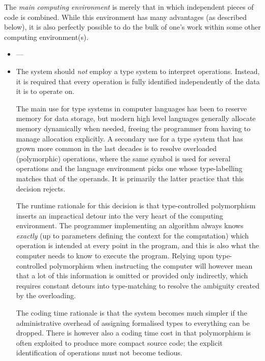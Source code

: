 \documentclass{mtmtcl}
\theoremstyle{plain}
\theoremstyle{remark}
\begin{document}
The \emph{main computing environment} is merely that in which 
independent pieces of code is combined. While this environment has 
many advantages (as described below), it is also perfectly possible 
to do the bulk of one's work within some other computing 
environment(s).


    
\begin{itemize}
    
  \item
    
    
    
    
    ---
    
    
    
  \item
    The system should \emph{not} employ a type system to interpret 
    operations. Instead, it is required that every operation is fully 
    identified independently of the data it is to operate on.
    
    The main use for type systems in computer languages has been to 
    reserve memory for data storage, but modern high level languages 
    generally allocate memory dynamically when needed, freeing the 
    programmer from having to manage allocation explicitly. 
    A secondary use for a type system that has grown more common in 
    the last decades is to resolve overloaded (polymorphic) 
    operations, where the same symbol is used for several operations 
    and the language environment picks one whose type-labelling 
    matches that of the operands. It is primarily the latter practice 
    that this decision rejects.
    
    The runtime rationale for this decision is that type-controlled 
    polymorphism inserts an impractical detour into the very heart of 
    the computing environment. The programmer implementing an 
    algorithm always knows \emph{exactly} (up to parameters defining 
    the context for the computation) which operation is intended at 
    every point in the program, and this is also what the computer 
    needs to know to execute the program. 
    Relying upon type-controlled polymorphism when instructing the 
    computer will however mean that a lot of this information is 
    omitted or provided only indirectly, which requires constant 
    detours into type-matching to resolve the ambiguity created by 
    the overloading.
    
    The coding time rationale is that the system becomes much simpler 
    if the administrative overhead of assigning formalised types to 
    everything can be dropped. There is however also a coding time 
    cost in that polymorphism is often exploited to produce more 
    compact source code; the explicit identification of operations 
    must not become tedious.
\end{itemize}
\end{document}
